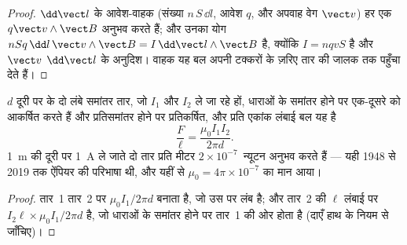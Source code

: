 \begin{proof}
$\dd\vect l$ के आवेश-वाहक (संख्या $n\,S\,\dd l$, आवेश $q$, और अपवाह वेग
$\vect v$) हर एक $q\vect v\wedge\vect B$ अनुभव करते हैं; और उनका योग
$nSq\,\dd l\,\vect v\wedge\vect B = I\,\dd\vect l\wedge\vect B$ है, क्योंकि $I = nqvS$
है और $\vect v$ $\dd\vect l$ के अनुदिश। वाहक यह बल अपनी टक्करों के ज़रिए तार
की जालक तक पहुँचा देते हैं।
\end{proof}

\begin{proposition}[समांतर तारों के बीच बल]\label{prop:b1:magnetostatics:parallel}
$d$ दूरी पर के दो लंबे समांतर तार, जो $I_1$ और $I_2$ ले जा रहे हों, धाराओं
के समांतर होने पर एक-दूसरे को आकर्षित करते हैं और प्रतिसमांतर होने पर
प्रतिकर्षित, और प्रति एकांक लंबाई बल यह है
\[
\frac{F}{\ell} = \frac{\mu_0I_1I_2}{2\pi d} .
\]
\qty{1}{m} की दूरी पर \qty{1}{A} ले जाते दो तार प्रति मीटर $2 \times 10^{-7}$~न्यूटन
अनुभव करते हैं --- यही 1948 से 2019 तक ऐंपियर की परिभाषा थी, और यहीं से
$\mu_0 = 4\pi \times 10^{-7}$ का मान आया।
\end{proposition}

\begin{proof}
तार~1 तार~2 पर $\mu_0I_1/2\pi d$ बनाता है, जो उस पर लंब है; और तार~2 की
$\ell$ लंबाई पर  $I_2\ell \times \mu_0I_1/2\pi d$ है, जो धाराओं के
समांतर होने पर तार~1 की ओर होता है (दाएँ हाथ के नियम से जाँचिए)।
\end{proof}


